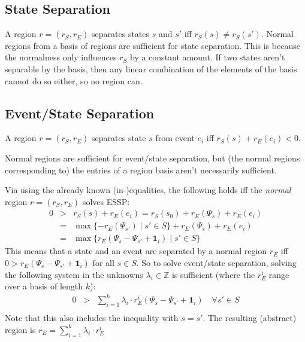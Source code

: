 \documentclass{scrartcl}
\newcommand{\Z}{\mathbb{Z}}
\newcommand{\1}{\textbf{1}}
\begin{document}
\subsection{State Separation}
A region \(r=(r_S,r_E)\) separates states \(s\) and \(s'\) iff \(r_S(s)\neq r_S(s')\).
Normal regions from a basis of regions are sufficient for state separation. This is because the normalness only
influences \(r_S\) by a constant amount. If two states aren't separable by the basis, then any linear combination of the
elements of the basis cannot do so either, so no region can.

\subsection{Event/State Separation}
A region \(r=(r_S,r_E)\) separates state \(s\) from event \(e_i\) iff \(r_S(s)+r_E(e_i)<0\).

Normal regions are sufficient for event/state separation, but (the normal regions corresponding to) the entries of a
region basis aren't necessarily sufficient.

Via using the already known (in-)equalities, the following holds iff the \emph{normal} region \(r=(r_S, r_E)\) solves ESSP:
\begin{eqnarray*}
0 &>& r_S(s)+r_E(e_i)
  = r_S(s_0)+r_E(\Psi_s)+r_E(e_i) \\
  &=& \max\lbrace -r_E(\Psi_{s'})\mid s'\in S\rbrace+r_E(\Psi_s)+r_E(e_i) \\
  &=& \max\lbrace r_E(\Psi_s-\Psi_{s'}+\1_i)\mid s'\in S\rbrace
\end{eqnarray*}
This means that a state and an event are separated by a normal region \(r_E\) iff
\(0>r_E(\Psi_s-\Psi_{s'}+\1_i)\) for all \(s\in S\). So to solve event/state separation, solving the following
system in the unknowns \(\lambda_i\in\Z\) is sufficient (where the \(r_E^i\) range over a basis of length \(k\)):
\begin{eqnarray*}
0 &>& \sum_{i=1}^k \lambda_i\cdot r_E^i(\Psi_s-\Psi_{s'}+\1_i) \quad\forall s'\in S \\
\end{eqnarray*}
Note that this also includes the inequality with \(s=s'\).
The resulting (abstract) region is
\(r_E = \sum_{i=1}^k \lambda_i\cdot r_E^i\)
\end{document}
